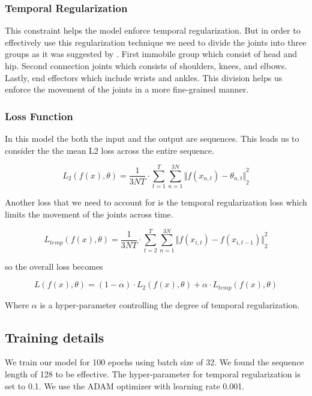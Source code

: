 \subsubsection{Temporal Regularization}

This constraint helps the model enforce temporal regularization. But in order to effectively use this regularization technique we need to divide the joints into three groups as it was suggested by \parencite{hossain2017understanding}. First immobile group which consist of head and hip. Second connection joints which consists of shoulders, knees, and elbows. Lastly, end effectors which include wrists and ankles. This division helps us enforce the movement of the joints in a more fine-grained manner.

\subsubsection{Loss Function}

In this model the both the input and the output are sequences. This leads us to consider the the mean L2 loss across the entire sequence.

\begin{equation}	
    L_2(f(x),\theta) = \frac{1}{3NT} \cdot \sum_{t=1}^{T} \sum_{n=1}^{3N} {\Vert f(x_{n,t})-\theta_{n,t} \Vert}_2^2
\end{equation}

Another loss that we need to account for is the temporal regularization loss which limits the movement of the joints across time.

\begin{equation}	
    L_{temp}(f(x),\theta) = \frac{1}{3NT} \cdot \sum_{t=2}^{T} \sum_{n=1}^{3N} {\Vert f(x_{i,t})-f(x_{i,t-1}) \Vert}_2^2
\end{equation}

so the overall loss becomes 

\begin{equation}	
    L(f(x),\theta) = (1-\alpha) \cdot L_2(f(x),\theta) + \alpha \cdot L_{temp}(f(x),\theta)
\end{equation}

Where $\alpha$ is a hyper-parameter controlling the degree of temporal regularization.

\subsection{Training details}

We train our model for 100 epochs using batch size of 32. We found the sequence length of 128 to be effective. The hyper-parameter for temporal regularization is set to 0.1. We use the ADAM optimizer with learning rate 0.001. 

